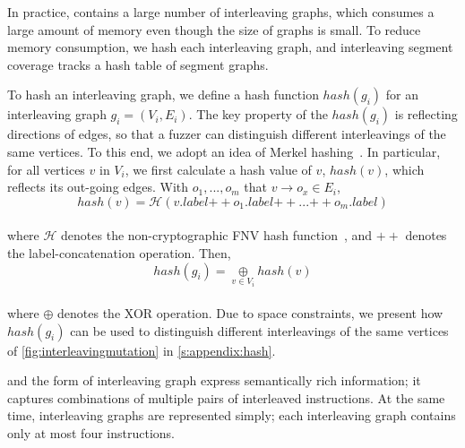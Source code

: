 %
In practice, \intcov contains a large number of interleaving graphs,
which consumes a large amount of memory even though the size of graphs
is small.
%
To reduce memory consumption, we hash each interleaving graph,
and interleaving segment coverage tracks a hash table of segment
graphs.



To hash an interleaving graph, we define a hash function $hash(g_i)$
for an interleaving graph $g_i = (V_i, E_i)$.
%
The key property of the $hash(g_i)$ is reflecting directions of edges,
so that a fuzzer can distinguish different interleavings of the same
vertices.
%
To this end, we adopt an idea of Merkel hashing~\cite{treehashing,
  treehashing2}.
%
%
In particular, for all vertices $v$ in $V_i$, we first calculate a
hash value of $v$, $hash(v)$, which reflects its out-going edges. With
$o_1, ..., o_m$ that $v \rightarrow o_x \in E_i$,
%
%
\\[1pt]
\[
  hash(v) = \mathcal{H}(v.label {++} o_1.label {++} ... {++}
  o_m.label)
\]
\\[1pt]
%
where $\mathcal{H}$ denotes the
non-cryptographic FNV hash function~\cite{fnv, fnv-go}, and ${++}$
denotes the label-concatenation operation.
%
Then,
%
\\[1pt]
\[
  hash(g_i) = \underset{v \in V_i}{\oplus} hash(v)
\]
\\[1pt]
%
where $\oplus$ denotes the XOR operation. Due to space constraints, we
present how $hash(g_i)$ can be used to distinguish different
interleavings of the same vertices of
\autoref{fig:interleavingmutation} in \autoref{s:appendix:hash}.





%
%
\Intcov and the form of interleaving graph express semantically rich
information; it captures combinations of multiple pairs of interleaved
instructions. At the same time, interleaving graphs are represented
simply; each interleaving graph contains only at most four
instructions.

